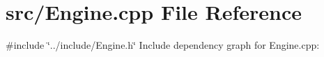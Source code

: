 \section{src/\-Engine.cpp \-File \-Reference}
\label{_engine_8cpp}
{\ttfamily \#include \char`\"{}../include/\-Engine.\-h\char`\"{}}\*
\-Include dependency graph for \-Engine.\-cpp\-:
